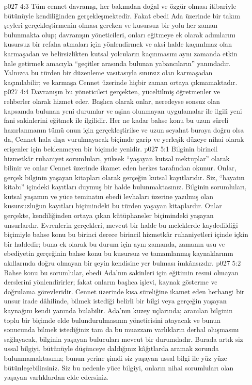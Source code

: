 \vs p027 4:3 Tüm cennet davranışı, her bakımdan doğal ve özgür olması itibariyle bütünüyle kendiliğinden gerçekleşmektedir. Fakat ebedi Ada üzerinde bir takım şeyleri gerçekleştirmenin olması gereken ve kusursuz bir yolu her zaman bulunmakta olup; davranışın yöneticileri, onları eğitmeye ek olarak adımlarını kusursuz bir refaha atmaları için yönlendirmek ve aksi halde kaçınılmaz olan karmaşadan ve belirsizlikten kutsal yolcuların kaçınmasını aynı zamanda etkin hale getirmek amacıyla “geçitler arasında bulunan yabancıların” yanındadır. Yalnızca bu türden bir düzenleme vasıtasıyla sınırsız olan karmaşadan kaçınılabilir; ve karmaşa Cennet üzerinde hiçbir zaman ortaya çıkmamaktadır.
\vs p027 4:4 Davranışın bu yöneticileri gerçekten, yüceltilmiş öğretmenler ve rehberler olarak hizmet eder. Başlıca olarak onlar, neredeyse sonsuz olan kapsamda bulunan yeni durumlar ve aşina olunmayan uygulamalar ile ilgili yeni fani sakinlerini eğitmek ile ilgilidir. Her ne kadar bahse konu bu uzun süreli hazırlanmanın tümü onun için gerçekleştirilse ve uzun seyahat buraya doğru olsa da, Cennet hala dışa vurulmayacak biçimde garip ve yerleşik düzeye nihai olarak erişenler için beklenmeyen bir biçimde yenidir.
\vs p027 5:1 Bilginin birincil hizmetkâr ruhaniyet sorumluları, yüksek “yaşayan kutsal mektuplar” olarak bilinir ve onlar Cennet üzerinde ikamet eden herkes tarafından okunur. Onlar, gerçek bilginin yaşayan kitapları olarak gerçeğin kutsal kayıtlarıdır. Siz, “hayatın kitabı” içindeki kayıtları duymuş bir halde bulunmaktasınız. Bilginin sorumluları, kutsal yaşamın ve yüce teminatın ebedi levhaları üzerine yazılmış olan kusursuzluğun kayıtları biçimindeki bu türden yaşayan kitaplardır. Onlar gerçekte, kendiliğinden ortaya çıkan kütüphaneler biçimindeki yaşayan unsurlardır. Evrenlerin gerçekleri, mevcut bir halde bu meleklerde kaydedildiği biçimiyle bahse konu bu birinci derece birincil hizmetkâr ruhaniyetleri içinde içkin bir haldedir; buna ek olarak bu durum için aynı zamanda, zamanın usu ve ebediyetin gerçeğinin bahse konu bu kusursuz ve tamamlanmış kaynaklarının akıllarında doğru olmayan bir şeyin kendisine yer bulması imkânsızdır.
\vs p027 5:2 Bahse konu bu sorumlular, ebedi Ada’nın sakinleri için eğitimin resmi olmayan derslerini yönlendirirler; fakat onların başlıca işlevi, kaynak gösterme ve doğrulama görevleridir. Cennet üzerinde kısa süreliğine ikamet eden herhangi bir unsur irade dâhilinde, bilmek istediği belirli bir bilgi veya gerçeğin yaşayan kaynağını kendi yanında bulabilir. Ada’nın kuzey uçlarında; aranılan bilginin toplu bir biçimde elde bulundurulmasının yöneticisini atayacak ve bunun sonucunda bilmek istediğiniz tam da bu muazzam varlıkların  derhal oluşmasını sağlayacak, bilginin yaşayan bulucuları mevcut bir durumdadır. Burada artık siz ussal bilgiyi, bütünüyle düşünceye daldığınız kâğıtlarda aramak zorunda bulunmamaktasınız; bunun yerine şimdi siz yaşayan ussal bilgi ile yüz yüze bütünleşebilirsiniz. Siz bu nedenle yüce bilgiyi, onların nihai sorumluları olan yaşayan varlıklardan elde edersiniz.
